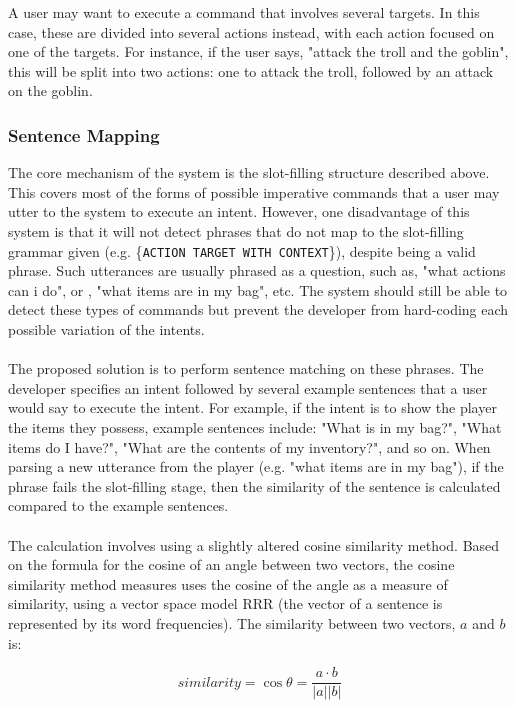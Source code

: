 \documentclass[12pt]{article}
\begin{document}
A user may want to execute a command that involves several targets. In this case, these are divided into several actions instead, with each action focused on one of the targets. For instance, if the user says, "attack the troll and the goblin", this will be split into two actions: one to attack the troll, followed by an attack on the goblin.

\subsubsection{Sentence Mapping}
\label{section:sentence-mapping}

The core mechanism of the system is the slot-filling structure described above. This covers most of the forms of possible imperative commands that a user may utter to the system to execute an intent. However, one disadvantage of this system is that it will not detect phrases that do not map to the slot-filling grammar given (e.g. \{\texttt{ACTION TARGET WITH CONTEXT}\}), despite being a valid phrase. Such utterances are usually phrased as a question, such as, "what actions can i do", or , "what items are in my bag", etc. The system should still be able to detect these types of commands but prevent the developer from hard-coding each possible variation of the intents.
\\
\\
The proposed solution is to perform sentence matching on these phrases. The developer specifies an intent followed by several example sentences that a user would say to execute the intent. For example, if the intent is to show the player the items they possess, example sentences include: "What is in my bag?", "What items do I have?", "What are the contents of my inventory?", and so on. When parsing a new utterance from the player (e.g. "what items are in my bag"), if the phrase fails the slot-filling stage, then the similarity of the sentence is calculated compared to the example sentences.
\\
\\
The calculation involves using a slightly altered cosine similarity method. Based on the formula for the cosine of an angle between two vectors, the cosine  similarity method measures uses the cosine of the angle as a measure of similarity, using a vector space model RRR (the vector of a sentence is represented by its word frequencies). The similarity between two vectors, $a$ and $b$ is:

$$similarity = \cos \theta = \frac{a \cdot b}{\lvert a\rvert\lvert b\rvert}$$
\end{document}
